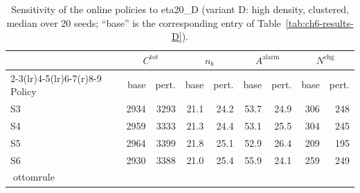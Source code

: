 \begin{table}[htbp]
\centering
\caption{Sensitivity of the online policies to eta20_D (variant D: high density, clustered,
median over 20 seeds; ``base'' is the corresponding entry of
Table~\ref{tab:ch6-results-D}).}
\label{tab:ch6-sens-D-eta20}
\footnotesize
\begin{tabular}{@{}l rr rr rr rr@{}}
\toprule
& \multicolumn{2}{c}{$C^{\mathrm{tot}}$} & \multicolumn{2}{c}{$n_b$}
  & \multicolumn{2}{c}{$A^{\mathrm{alarm}}$} & \multicolumn{2}{c}{$N^{\mathrm{chg}}$} \\
\cmidrule(r){2-3}\cmidrule(lr){4-5}\cmidrule(lr){6-7}\cmidrule(r){8-9}
Policy & base & pert. & base & pert. & base & pert. & base & pert. \\
\midrule

S3 & 2934 & 3293 & 21.1 & 24.2 & 53.7 & 24.9 & 306 & 248 \\
S4 & 2959 & 3333 & 21.3 & 24.4 & 53.1 & 25.5 & 304 & 245 \\
S5 & 2964 & 3399 & 21.8 & 25.1 & 52.9 & 26.4 & 209 & 195 \\
S6 & 2930 & 3388 & 21.0 & 25.4 & 55.9 & 24.1 & 259 & 249 \\
ottomrule
\end{tabular}
\end{table}
